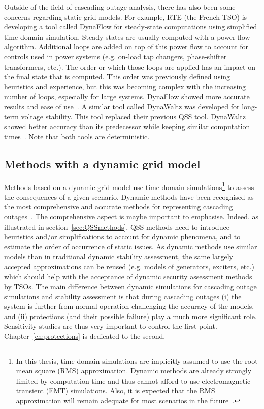 Outside of the field of cascading outage analysis, there has also been some concerns regarding static grid models. For example, RTE (the French TSO) is developing a tool called DynaFlow for steady-state computations using simplified time-domain simulation. Steady-states are usually computed with a power flow algorithm. Additional loops are added on top of this power flow to account for controls used in power systems (e.g. on-load tap changers, phase-shifter transformers, etc.). The order or which those loops are applied has an impact on the final state that is computed. This order was previously defined using heuristics and experience, but this was becoming complex with the increasing number of loops, especially for large systems. DynaFlow showed more accurate results and ease of use~\cite{DynaFlow}. A similar tool called DynaWaltz was developed for long-term voltage stability. This tool replaced their previous QSS tool. DynaWaltz showed better accuracy than its predecessor while keeping similar computation times~\cite{DynaWaltz}. Note that both tools are deterministic.


\subsection{Methods with a dynamic grid model}
\label{sec:DynMethods}

Methods based on a dynamic grid model use time-domain simulations\footnote{In this thesis, time-domain simulations are implicitly assumed to use the root mean square (RMS) approximation. Dynamic methods are already strongly limited by computation time and thus cannot afford to use electromagnetic transient (EMT) simulations. Also, it is expected that the RMS approximation will remain adequate for most scenarios in the future~\cite{GridFormingAreTheyTheKey, AvoidEMT}.} to assess the consequences of a given scenario. Dynamic methods have been recognised as the most comprehensive and accurate methods for representing cascading outages~\cite{BenchmarkingStaticVsDynamic, BenefitsAndChallengesDynamicPreece, SongPaper}. The comprehensive aspect is maybe important to emphasise. Indeed, as illustrated in section~\ref{sec:QSSmethods}, QSS methods need to introduce heuristics and/or simplifications to account for dynamic phenomena, and to estimate the order of occurrence of static issues. As dynamic methods use similar models than in traditional dynamic stability assessment, the same largely accepted approximations can be reused (e.g. models of generators, exciters, etc.) which should help with the acceptance of dynamic security assessment methods by TSOs. The main difference between dynamic simulations for cascading outage simulations and stability assessment is that during cascading outages (i) the system is further from normal operation challenging the accuracy of the models, and (ii) protections (and their possible failure) play a much more significant role. Sensitivity studies are thus very important to control the first point. Chapter~\ref{ch:protections} is dedicated to the second.


